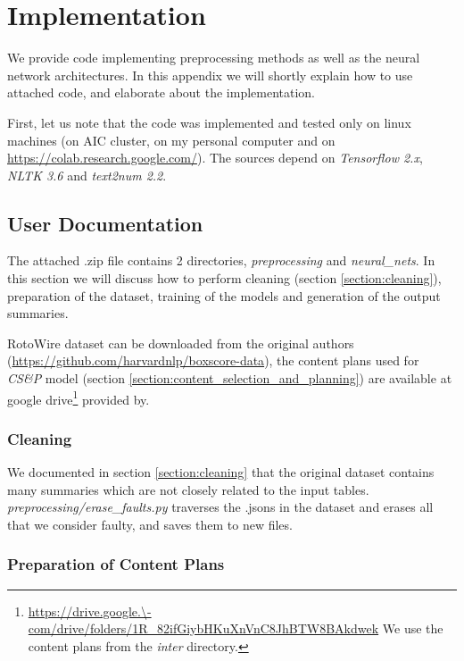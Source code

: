 \chapter{Implementation} \label{chapter:appendix_a}

We provide code implementing preprocessing methods as well as the neural network architectures. In this appendix we will shortly explain how to use attached code, and elaborate about the implementation.

First, let us note that the code was implemented and tested only on linux machines (on AIC cluster, on my personal computer and on \url{https://colab.research.google.com/}). The sources depend on \emph{Tensorflow 2.x}, \emph{NLTK 3.6} and \emph{text2num 2.2}.

\section{User Documentation}

The attached .zip file contains 2 directories, \emph{preprocessing} and \emph{neural\_nets}. In this section we will discuss how to perform cleaning (section \ref{section:cleaning}), preparation of the dataset, training of the models and generation of the output summaries.

RotoWire dataset can be downloaded from the original authors \citep{wiseman2017} (\url{https://github.com/harvardnlp/boxscore-data}), the content plans used for \emph{CS\&P} model (section \ref{section:content_selection_and_planning}) are available at google drive\footnote{\url{https://drive.google.\-com/drive/folders/1R_82ifGiybHKuXnVnC8JhBTW8BAkdwek} We use the content plans from the \emph{inter} directory.} provided by\linebreak\citet{puduppully2019datatotext}.

\subsection{Cleaning}

We documented in section \ref{section:cleaning} that the original dataset contains many summaries which are not closely related to the input tables. \emph{preprocessing/erase\_faults.py} traverses the .jsons in the dataset and erases all that we consider faulty, and saves them to new files.

\subsection{Preparation of Content Plans}

